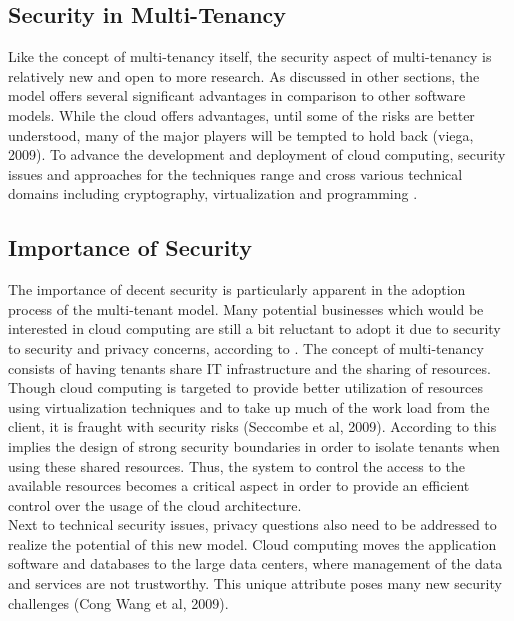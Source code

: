 \subsection{Security in Multi-Tenancy}
Like the concept of multi-tenancy itself, the security aspect of multi-tenancy is relatively new and open to more research. As discussed in other sections, the model offers several significant advantages in comparison to other software models. While the cloud offers advantages, until some of the risks are better understood, many of the major players will be tempted to hold back (viega, 2009). To advance the development and deployment of cloud computing, security issues and approaches for the techniques range and cross various technical domains including cryptography, virtualization and programming \cite{Takahashi2012Security}.\\

\subsection{Importance of Security}
The importance of decent security is particularly apparent in the adoption process of the multi-tenant model. Many potential businesses which would be interested in cloud computing are still a bit reluctant to adopt it due to security to security and privacy concerns, according to \cite{Bernabe2012Auth}. The concept of multi-tenancy consists of having tenants share IT infrastructure and the sharing of resources. Though cloud computing is targeted to provide better utilization of resources using virtualization techniques and to take up much of the work load from the client, it is fraught with security risks (Seccombe et al, 2009). According to \cite{Takahashi2012Security} this implies the design of strong security boundaries in order to isolate tenants when using these shared resources. Thus, the system to control the access to the available resources becomes a critical aspect in order to provide an efficient control over the usage of the cloud architecture. \\
Next to technical security issues, privacy questions also need to be addressed to realize the potential of this new model. Cloud computing moves the application software and databases to the large data centers, where management of the data and services are not trustworthy. This unique attribute poses many new security challenges (Cong Wang et al, 2009). \\

